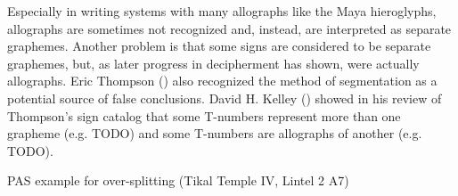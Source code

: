 \documentclass[../main.tex]{subfiles}
\begin{document}
Especially in writing systems with many allographs like the Maya hieroglyphs,
allographs are sometimes not recognized and, instead, are interpreted as separate graphemes. 
Another problem is that some signs are considered to be separate graphemes, 
but, as later progress in decipherment has shown, were actually allographs.
Eric Thompson (\cite[12\psq]{thompson1962catalog}) also recognized the method of segmentation as 
a potential source of false conclusions.
David H. Kelley (\cite{kelley1962}) showed in his review of Thompson's sign catalog that
some T-numbers represent more than one grapheme (e.g. TODO) and some 
T-numbers are allographs of another (e.g. TODO).






PAS example for over-splitting (Tikal Temple IV, Lintel 2 A7)
\end{document}
